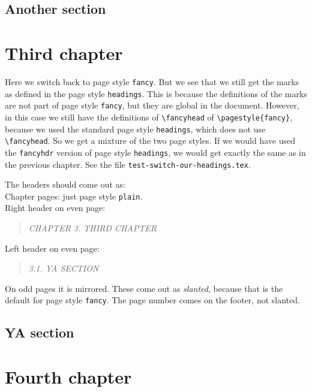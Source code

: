 \documentclass[openany]{book}
\begin{document}
\lipsum[1]

\section{Another section}

\lipsum

\newpage
\pagestyle{fancy}
\chapter{Third chapter}

\noindent
\begin{boxedminipage}{\textwidth}
Here we switch back to page style \texttt{fancy}.
But we see that we still get the marks as defined in the page style \texttt{headings}.
This is because the definitions of the marks are not part of page style \texttt{fancy}, but they are global in the document.
However, in this case we still have the definitions of \verb|\fancyhead| of \verb|\pagestyle{fancy}|, because we used the standard page style \texttt{headings}, which does not use  \verb|\fancyhead|. So we get a mixture of the two page styles. If we would have used the \texttt{fancyhdr} version of page style \texttt{headings}, we would get exactly the same as in the previous chapter. See the file \texttt{test-switch-our-headings.tex}.

The headers should come out as:
\\
Chapter pages: just page style \texttt{plain}.
\\
Right header on even page:
\begin{quote}
  \textsl{CHAPTER 3. THIRD CHAPTER}
\end{quote}
Left header on even page:
\begin{quote}
  \textsl{3.1. YA SECTION}
\end{quote}
On odd pages it is mirrored.
These come out as \textsl{slanted}, because that is the default for page style \texttt{fancy}.
The page number comes on the footer, not slanted.
\end{boxedminipage}
\bigskip

\lipsum[1]

\section{YA section}

\lipsum

\newpage
\pagestyle{myfancy}
\chapter{Fourth chapter}
\end{document}
